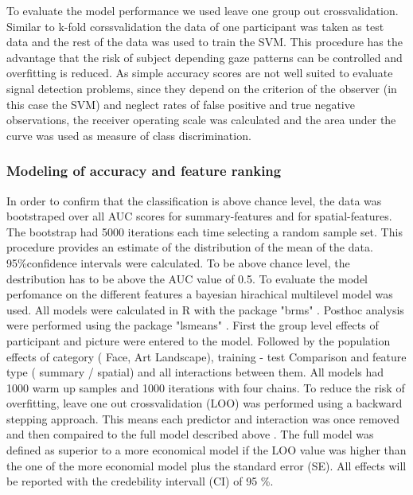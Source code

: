 \documentclass[a4paper,man,natbib,floatsintext]{apa6}
\begin{document}
To evaluate the model performance we used leave one group out crossvalidation. Similar to k-fold corssvalidation the data of one participant was taken as test data and the rest of the data was used to train the SVM. This procedure has the advantage that the risk of subject depending gaze patterns can be controlled and overfitting is reduced. As simple accuracy scores are not well suited to evaluate signal detection problems, since they depend on the criterion of the observer (in this case the SVM)  and neglect rates of false positive and true negative observations, the receiver operating scale was calculated and the area under the curve was used as measure of class discrimination.\\

\subsubsection{Modeling of accuracy and feature ranking}
In order to confirm that the classification is above chance level, the data was bootstraped over all AUC scores for summary-features and for spatial-features. The bootstrap had 5000 iterations each time selecting a random sample set. This procedure provides an estimate of the distribution of the mean of the data. 95\%confidence intervals were calculated. To be above chance level, the destribution has to be above the AUC value of 0.5.
To evaluate the model perfomance on the different features a bayesian hirachical multilevel model was used.  All models were calculated in R \citep{RDevelopmentCoreTeam2016} with the package "brms" \citep{buerkner2016brms}. Posthoc analysis were performed using the package "lsmeans" \citep{Lenth2016}. First the group level effects of participant and picture were entered to the model. Followed by the population effects of category ( Face, Art Landscape), training - test Comparison and feature type ( summary / spatial) and all interactions between them. All models had 1000 warm up samples and 1000 iterations with four chains. To reduce the risk of overfitting, leave one out crossvalidation (LOO) was performed using a backward stepping approach. This means each predictor and interaction was once removed and then compaired to the full model described above \citep{Vehtari2016}. The full model was defined as superior to a more economical model if the LOO value was higher than the one of the more economial model plus the standard error (SE). All effects will be reported with the credebility intervall (CI) of 95 \%. \\
\end{document}
